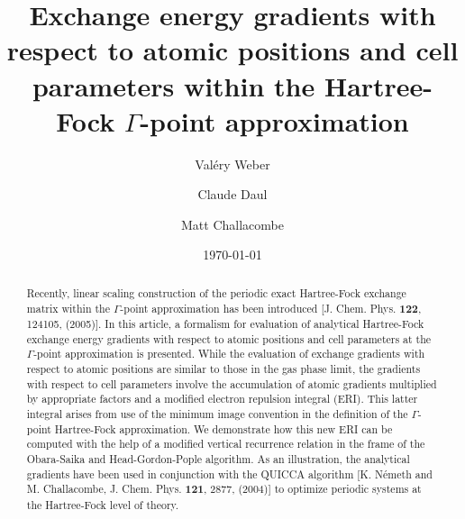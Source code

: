 \documentclass[prl,preprint,doublespace]{revtex4} %
\begin{document}

\title{Exchange energy gradients with respect to atomic positions and cell parameters
  within the Hartree-Fock $\Gamma$-point approximation}

\author{Val\'ery Weber}
\author{Claude Daul}
%
\author{Matt Challacombe}%
%

\date{\today}%


\begin{abstract}
  Recently, linear scaling construction of the periodic exact Hartree-Fock exchange 
  matrix within the $\Gamma$-point approximation
  has been introduced   [J. Chem. Phys. {\bf 122}, 124105, (2005)].
  In this article, a formalism for evaluation of 
  analytical Hartree-Fock exchange energy gradients with respect to atomic positions and cell parameters at
  the $\Gamma$-point approximation is presented. While the evaluation of 
  exchange gradients with respect to atomic positions are similar to those in the gas phase limit, the 
  gradients with respect to cell parameters involve the accumulation of atomic gradients multiplied 
  by appropriate factors and a modified electron repulsion integral (ERI). This latter
  integral arises from use of the minimum image convention 
  in the definition of the $\Gamma$-point Hartree-Fock approximation. 
  We demonstrate how
  this new ERI can be computed with the help of a modified vertical 
  recurrence relation in the frame of the Obara-Saika and Head-Gordon-Pople 
  algorithm.  As an illustration, the analytical gradients have been used 
  in conjunction with the QUICCA algorithm [K. N\'emeth and M. Challacombe,
  J. Chem. Phys. {\bf 121}, 2877, (2004)] to optimize periodic 
  systems at the Hartree-Fock level of theory.
\end{abstract}


\maketitle
\end{document}
